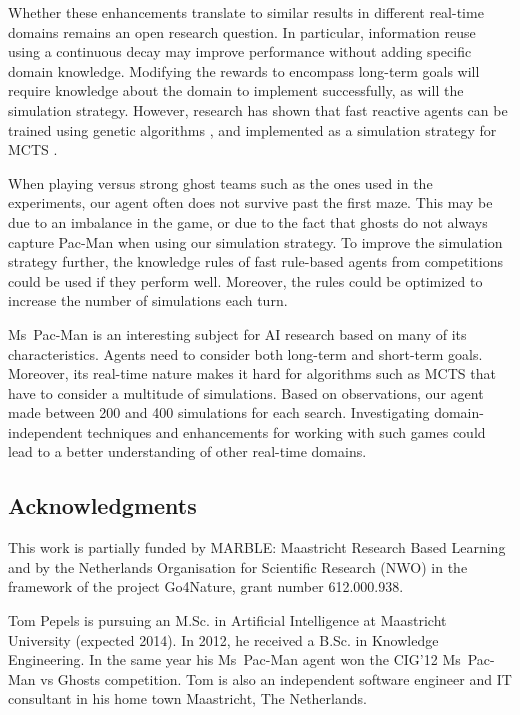 \documentclass[journal]{IEEEtran}
\begin{document}
Whether these enhancements translate to similar results in different real-time domains remains an open research question. In particular, information reuse using a continuous decay may improve performance without adding specific domain knowledge. Modifying the rewards to encompass long-term goals will require knowledge about the domain to implement successfully, as will the simulation strategy. However, research has shown that fast reactive agents can be trained using genetic algorithms \cite{brandstetterreactive,alhejali2010evolving}, and implemented as a simulation strategy for MCTS \cite{alhejali2013genetic}.

When playing versus strong ghost teams such as the ones used in the experiments, our agent often does not survive past the first maze. This may be due to an imbalance in the game, or due to the fact that ghosts do not always capture Pac-Man when using our simulation strategy. 
To improve the simulation strategy further, the knowledge rules of fast rule-based agents from competitions could be used if they perform well. Moreover, the rules could be optimized to increase the number of simulations each turn.

Ms~Pac-Man is an interesting subject for AI research based on many of its characteristics. Agents need to consider both long-term and short-term goals. Moreover, its real-time nature makes it hard for algorithms such as MCTS that have to consider a multitude of simulations. Based on observations, our agent made between 200 and 400 simulations for each search. Investigating domain-independent techniques and enhancements for working with such games could lead to a better understanding of other real-time domains.

\subsection*{Acknowledgments}
This work is partially funded by MARBLE: Maastricht Research Based Learning and by the Netherlands Organisation for
Scientific Research (NWO) in the framework of the project Go4Nature, grant number 612.000.938.




\begin{IEEEbiography}{Tom Pepels} is pursuing an M.Sc. in Artificial Intelligence at Maastricht University (expected 2014). In 2012, he received a B.Sc. in Knowledge Engineering. In the same year his Ms~Pac-Man agent won the CIG'12 Ms~Pac-Man vs Ghosts competition. Tom is also an independent software engineer and IT consultant in his home town Maastricht, The Netherlands.
\end{IEEEbiography}
\end{document}
